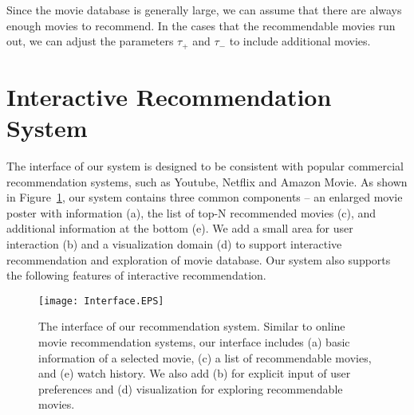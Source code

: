 \documentclass{vgtc}                          %
\begin{document}
Since the movie database is generally large, we can assume that there are always enough movies to recommend.
In the cases that the recommendable movies run out, we can adjust the parameters $\tau_+$ and $\tau_-$ to include additional movies.

%
\section{Interactive Recommendation System}

The interface of our system is designed to be consistent with popular commercial recommendation systems, such as Youtube, Netflix and Amazon Movie. 
As shown in Figure~\ref{interface}, our system contains three common components -- an enlarged movie poster with information (a), the list of top-N recommended movies (c), and additional information at the bottom (e).
We add a small area for user interaction (b) and a visualization domain (d) to support interactive recommendation and exploration of movie database.
Our system also supports the following features of interactive recommendation.


\begin{figure}[htb]
\centering
\texttt{[image: Interface.EPS]}
\caption{The interface of our recommendation system.
Similar to online movie recommendation systems, our interface includes (a) basic information of a selected movie, (c) a list of recommendable movies, and (e) watch history.
We also add (b) for explicit input of user preferences and (d) visualization for exploring recommendable movies.
}
\label{interface}
\end{figure}
\end{document}

